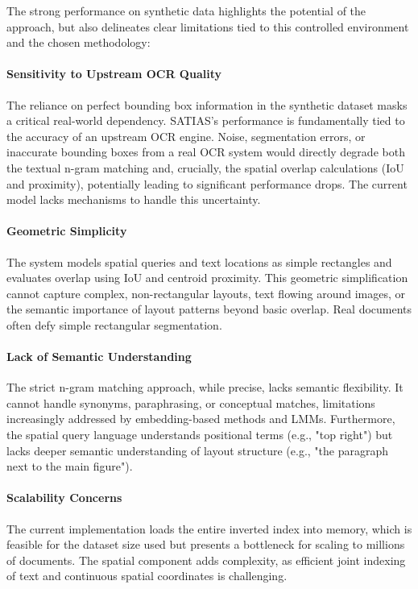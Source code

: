 \documentclass[sigconf,screen]{acmart}
\begin{document}
The strong performance on synthetic data highlights the potential of the approach, but also delineates clear limitations tied to this controlled environment and the chosen methodology:

\paragraph{Sensitivity to Upstream OCR Quality}
The reliance on perfect bounding box information in the synthetic dataset masks a critical real-world dependency. SATIAS's performance is fundamentally tied to the accuracy of an upstream OCR engine. Noise, segmentation errors, or inaccurate bounding boxes from a real OCR system would directly degrade both the textual n-gram matching and, crucially, the spatial overlap calculations (IoU and proximity), potentially leading to significant performance drops. The current model lacks mechanisms to handle this uncertainty.

\paragraph{Geometric Simplicity}
The system models spatial queries and text locations as simple rectangles and evaluates overlap using IoU and centroid proximity. This geometric simplification cannot capture complex, non-rectangular layouts, text flowing around images, or the semantic importance of layout patterns beyond basic overlap. Real documents often defy simple rectangular segmentation.

\paragraph{Lack of Semantic Understanding}
The strict n-gram matching approach, while precise, lacks semantic flexibility. It cannot handle synonyms, paraphrasing, or conceptual matches, limitations increasingly addressed by embedding-based methods and LMMs. Furthermore, the spatial query language understands positional terms (e.g., "top right") but lacks deeper semantic understanding of layout structure (e.g., "the paragraph next to the main figure").

\paragraph{Scalability Concerns}
The current implementation loads the entire inverted index into memory, which is feasible for the dataset size used but presents a bottleneck for scaling to millions of documents. The spatial component adds complexity, as efficient joint indexing of text and continuous spatial coordinates is challenging.
\end{document}

